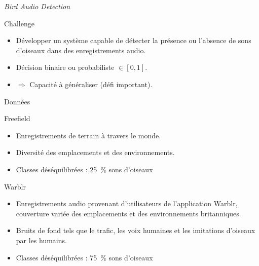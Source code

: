 \documentclass[compress,xcolor=table]{beamer}
\begin{document}
\begin{frame}{\textit{Bird Audio Detection}}

    \begin{block}{Challenge}
        \begin{itemize}
            \item Développer un système capable de détecter la présence ou l'absence de sons d'oiseaux dans des enregistrements audio.
            \item Décision binaire ou probabiliste $\in [0,1]$.
            \item $\Rightarrow$ Capacité à généraliser (défi important).
        \end{itemize}
    \end{block}

\end{frame}

\begin{frame}{Données}

    \begin{exampleblock}{Freefield}
        \begin{itemize}
            \item Enregistrements de terrain à travers le monde.
            \item Diversité des emplacements et des environnements.
            \item \warning Classes déséquilibrées : 25~\% sons d'oiseaux
        \end{itemize}
    \end{exampleblock}

    \begin{exampleblock}{Warblr}
        \begin{itemize}
            \item Enregistrements audio provenant d'utilisateurs de l'application Warblr, couverture variée des emplacements et des environnements britanniques.
            \item Bruits de fond tels que le trafic, les voix humaines et les imitations d'oiseaux par les humains.
            \item \warning Classes déséquilibrées : 75~\% sons d'oiseaux
        \end{itemize}
    \end{exampleblock}

\end{frame}
\end{document}
